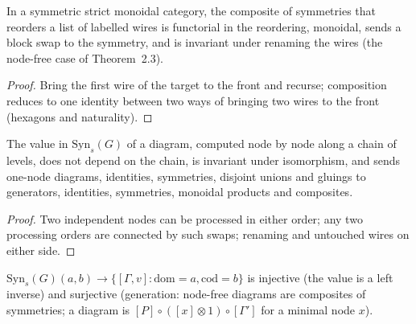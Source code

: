 \begin{theorem}
\label{s7:perm}
\leanok
In a symmetric strict monoidal category, the composite of symmetries that reorders a list
of labelled wires is functorial in the reordering, monoidal, sends a block swap to the
symmetry, and is invariant under renaming the wires (the node-free case of Theorem~2.3).
\end{theorem}
\begin{proof}
\leanok
Bring the first wire of the target to the front and recurse; composition reduces to one
identity between two ways of bringing two wires to the front (hexagons and naturality).
\end{proof}

\begin{theorem}
\label{s7:value}
\leanok
{}
The value in $\mathrm{Syn}_s(G)$ of a diagram, computed node by node along a chain of levels,
does not depend on the chain, is invariant under isomorphism, and sends one-node diagrams,
identities, symmetries, disjoint unions and gluings to generators, identities, symmetries,
monoidal products and composites.
\end{theorem}
\begin{proof}
\leanok
Two independent nodes can be processed in either order; any two processing orders are
connected by such swaps; renaming and untouched wires on either side.
\end{proof}

\begin{theorem}
\label{s7:bij}
\leanok
{}
$\mathrm{Syn}_s(G)(a, b) \to \{[\Gamma, v] : \mathrm{dom} = a, \mathrm{cod} = b\}$ is injective
(the value is a left inverse) and surjective (generation: node-free diagrams are composites of
symmetries; a diagram is $[P] \circ ([x] \otimes 1) \circ [\Gamma']$ for a minimal node $x$).
\end{theorem}

